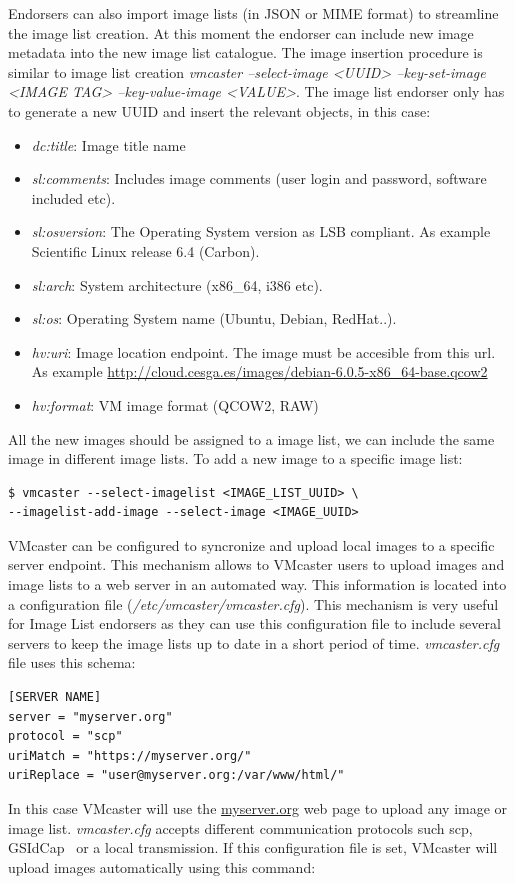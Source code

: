 \documentclass{cai}
\begin{document}
Endorsers can also import image lists (in JSON or MIME format) to streamline the image list creation. At this moment the endorser can include new image metadata into the new image list catalogue.
The image insertion procedure is similar to image list creation \textit{vmcaster --select-image <UUID> --key-set-image <IMAGE TAG> --key-value-image <VALUE>}.  
The image list endorser only has to generate a new UUID and insert the relevant objects, in this case:
\begin{itemize}
 \item \textit{dc:title}: Image title name
 \item \textit{sl:comments}: Includes image comments (user login and password, software included etc).
 \item \textit{sl:osversion}: The Operating System version as LSB compliant. As example Scientific Linux release 6.4 (Carbon).
 \item \textit{sl:arch}: System architecture (x86\_64, i386 etc).
 \item \textit{sl:os}: Operating System name (Ubuntu, Debian, RedHat..).
 \item \textit{hv:uri}: Image location endpoint. The image must be accesible from this url. As example \url{http://cloud.cesga.es/images/debian-6.0.5-x86_64-base.qcow2}
 \item \textit{hv:format}: VM image format (QCOW2, RAW)
\end{itemize}
All the new images should be assigned to a image list, we can include the same image in different image lists. To add a new image to a specific image list:

\begin{verbatim}
$ vmcaster --select-imagelist <IMAGE_LIST_UUID> \
--imagelist-add-image --select-image <IMAGE_UUID>
\end{verbatim}

VMcaster can be configured to syncronize and upload local images to a specific server endpoint. This mechanism allows to VMcaster users to upload images and image lists to a web server in an automated way.
This information is located into a configuration file (\textit{/etc/vmcaster/vmcaster.cfg}). This mechanism is very useful for Image List endorsers as they can use this configuration file to include several servers to keep the image lists up to date in a short period of time.
\textit{vmcaster.cfg} file uses this schema:
\begin{verbatim}
[SERVER NAME]
server = "myserver.org"
protocol = "scp"
uriMatch = "https://myserver.org/"
uriReplace = "user@myserver.org:/var/www/html/"
\end{verbatim}
In this case VMcaster will use the \url{myserver.org} web page to upload any image or image list. 
\textit{vmcaster.cfg} accepts different communication protocols such scp, GSIdCap~\cite{dcache} or a local transmission. If this configuration file is set, VMcaster will upload images automatically using this command:
\end{document}
